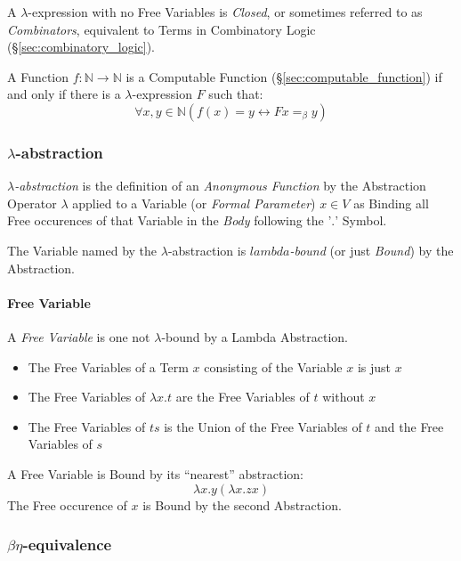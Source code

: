 A $\lambda$-expression with no Free Variables is \emph{Closed}, or
sometimes referred to as \emph{Combinators}, equivalent to Terms in
Combinatory Logic (\S\ref{sec:combinatory_logic}).

A Function $f : \mathbb{N} \rightarrow \mathbb{N}$ is a Computable
Function (\S\ref{sec:computable_function}) if and only if there is a
$\lambda$-expression $F$ such that:
\[
  \forall x,y \in \mathbb{N} (f(x)=y \leftrightarrow F x =_\beta y)
\]



\subsubsection{$\lambda$-abstraction}\label{sec:lambda_abstraction}

\emph{$\lambda$-abstraction} is the definition of an \emph{Anonymous
  Function} by the Abstraction Operator $\lambda$ applied to a
Variable (or \emph{Formal Parameter}) $x \in V$ as Binding all Free
occurences of that Variable in the \emph{Body} following the '$.$'
Symbol.

The Variable named by the $\lambda$-abstraction is
\emph{$lambda$-bound} (or just \emph{Bound}) by the Abstraction.



\paragraph{Free Variable}\label{sec:free_variable}\hfill

A \emph{Free Variable} is one not $\lambda$-bound by a Lambda
Abstraction.

\begin{itemize}
  \item The Free Variables of a Term $x$ consisting of the Variable
    $x$ is just $x$
  \item The Free Variables of $\lambda x.t$ are the Free Variables of
    $t$ without $x$
  \item The Free Variables of $ts$ is the Union of the Free Variables
    of $t$ and the Free Variables of $s$
\end{itemize}

A Free Variable is Bound by its ``nearest'' abstraction:
\[
  \lambda x.y (\lambda x.z x)
\]
The Free occurence of $x$ is Bound by the second Abstraction.



\subsubsection{$\beta\eta$-equivalence}\label{sec:beta_eta}

